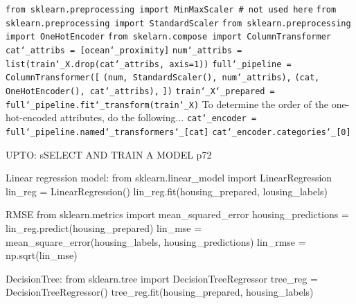 \texttt{from sklearn.preprocessing import MinMaxScaler \# not used here}\newline
\texttt{from sklearn.preprocessing import StandardScaler}\newline
\texttt{from sklearn.preprocessing import OneHotEncoder}\newline
\texttt{from skelarn.compose import ColumnTransformer}\newline
\newline
\texttt{cat\char`_attribs = [\textquotesingle ocean\char`_proximity\textquotesingle]}\newline
\texttt{num\char`_attribs = list(train\char`_X.drop(cat\char`_attribs, axis=1))}\newline
\newline
\texttt{full\char`_pipeline = ColumnTransformer([}\newline
\texttt{(\textquotesingle num\textquotesingle, StandardScaler(), num\char`_attribs),}\newline
\texttt{(\textquotesingle cat\textquotesingle, OneHotEncoder(), cat\char`_attribs),}\newline
\texttt{])}\newline
\newline
\texttt{train\char`_X\char`_prepared = full\char`_pipeline.fit\char`_transform(train\char`_X)}\newline
\newline
To determine the order of the one-hot-encoded attributes, do the following...\newline
\texttt{cat\char`_encoder = full\char`_pipeline.named\char`_transformers\char`_[\textquotesingle cat\textquotesingle]}\newline
\texttt{cat\char`_encoder.categories\char`_[0]}





UPTO: sSELECT AND TRAIN A MODEL p72

Linear regression model:
from sklearn.linear_model import LinearRegression
lin_reg = LinearRegression()
lin_reg.fit(housing_prepared, lousing_labels)

RMSE
from sklearn.metrics import mean_squared_error
housing_predictions = lin_reg.predict(housing_prepared)
lin_mse = mean_square_error(housing_labels, housing_predictions)
lin_rmse = np.sqrt(lin_mse)

DecisionTree:
from sklearn.tree import DecisionTreeRegressor
tree_reg = DecisionTreeRegressor()
tree_reg.fit(housing_prepared, housing_labels)

